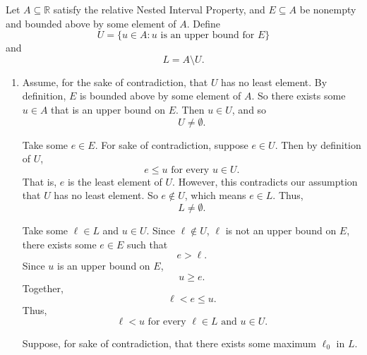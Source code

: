 \documentclass[12pt]{article}
\begin{document}
Let $A \subseteq \mathbb{R}$ satisfy the relative Nested Interval Property, and
$E \subseteq A$ be nonempty and bounded above by some element of $A$.
Define
\[
      U = \{u \in A : u \text{ is an upper bound for } E\}
\]
and
\[
      L = A \setminus U.
\]
\begin{enumerate}
      \item [(a)]
            Assume, for the sake of contradiction, that $U$ has no least element.
            By definition, $E$ is bounded above by some element of $A$.
            So there exists some $u \in A$ that is an upper bound on $E$.
            Then $u \in U$, and so
            \[ U \neq \emptyset. \]

            Take some $e \in E$.
            For sake of contradiction, suppose $e \in U$.
            Then by definition of $U$,
            \[
                  e \leq u \text{ for every } u \in U.
            \]
            That is, $e$ is the least element of $U$.
            However, this contradicts our assumption that $U$ has no least element.
            So $e \notin U$, which means $e \in L$. Thus,
            \[
                  L \neq \emptyset.
            \]

            Take some $\ell \in L$ and $u \in U$.
            Since $\ell \notin U$, $\ell$ is not an upper bound on $E$,
            there exists some $e \in E$ such that
            \[
                  e > \ell.
            \]
            Since $u$ is an upper bound on $E$,
            \[
                  u \geq e.
            \]
            Together,
            \[
                  \ell < e \leq u.
            \]
            Thus,
            \[
                  \ell < u \text{ for every } \ell \in L \text{ and } u \in U.
            \]

            Suppose, for sake of contradiction, that there exists some maximum $\ell_0$ in $L$.


\end{enumerate}
\end{document}
